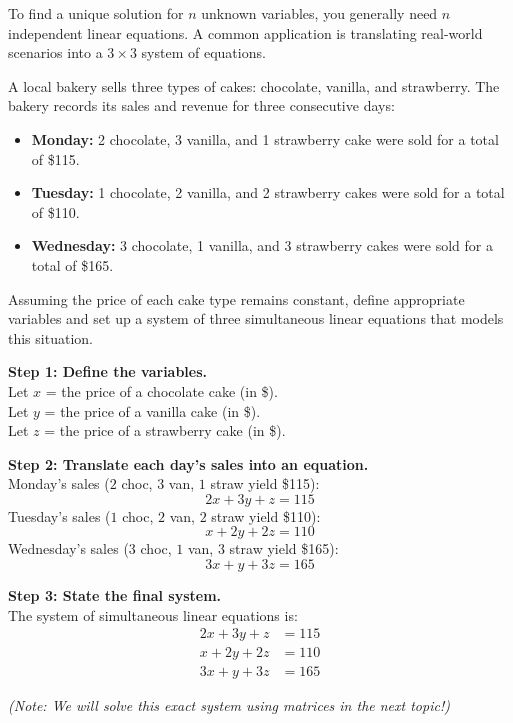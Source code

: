 To find a unique solution for $n$ unknown variables, you generally need $n$ independent linear equations. A common application is translating real-world scenarios into a $3 \times 3$ system of equations.

\bigskip

\begin{problem}
A local bakery sells three types of cakes: chocolate, vanilla, and strawberry. The bakery records its sales and revenue for three consecutive days:
\begin{itemize}
  \item \textbf{Monday:} 2 chocolate, 3 vanilla, and 1 strawberry cake were sold for a total of \$115.
  \item \textbf{Tuesday:} 1 chocolate, 2 vanilla, and 2 strawberry cakes were sold for a total of \$110.
  \item \textbf{Wednesday:} 3 chocolate, 1 vanilla, and 3 strawberry cakes were sold for a total of \$165.
\end{itemize}

Assuming the price of each cake type remains constant, define appropriate variables and set up a system of three simultaneous linear equations that models this situation.
\end{problem}

\begin{solution}
\textbf{Step 1: Define the variables.} \\
Let $x$ = the price of a chocolate cake (in \$). \\
Let $y$ = the price of a vanilla cake (in \$). \\
Let $z$ = the price of a strawberry cake (in \$).

\medskip
\textbf{Step 2: Translate each day's sales into an equation.} \\
Monday's sales ($2$ choc, $3$ van, $1$ straw yield \$115):
\[ 2x + 3y + z = 115 \]
Tuesday's sales ($1$ choc, $2$ van, $2$ straw yield \$110):
\[ x + 2y + 2z = 110 \]
Wednesday's sales ($3$ choc, $1$ van, $3$ straw yield \$165):
\[ 3x + y + 3z = 165 \]

\medskip
\textbf{Step 3: State the final system.} \\
The system of simultaneous linear equations is:
\begin{align*}
2x + 3y + z &= 115 \\
x + 2y + 2z &= 110 \\
3x + y + 3z &= 165
\end{align*}

\emph{(Note: We will solve this exact system using matrices in the next topic!)}
\end{solution}

